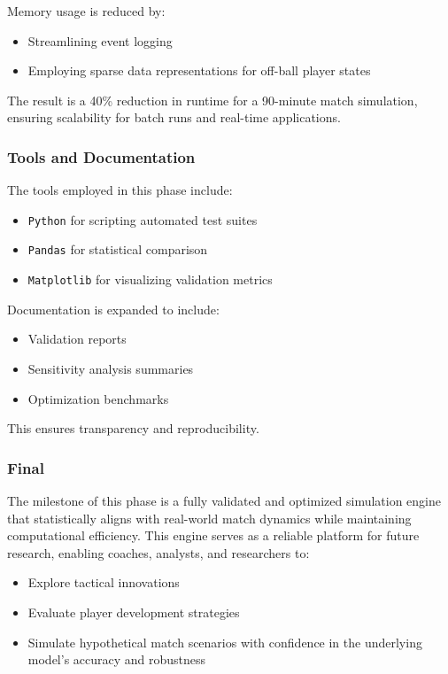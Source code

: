 \documentclass[12pt]{article}
\begin{document}
Memory usage is reduced by:
\begin{itemize}
    \item Streamlining event logging
    \item Employing sparse data representations for off-ball player states
\end{itemize}

The result is a 40\% reduction in runtime for a 90-minute match simulation, ensuring scalability for batch runs and real-time applications.

\subsubsection{Tools and Documentation}
The tools employed in this phase include:
\begin{itemize}
    \item \texttt{Python} for scripting automated test suites
    \item \texttt{Pandas} for statistical comparison
    \item \texttt{Matplotlib} for visualizing validation metrics
\end{itemize}

Documentation is expanded to include:
\begin{itemize}
    \item Validation reports
    \item Sensitivity analysis summaries
    \item Optimization benchmarks
\end{itemize}

This ensures transparency and reproducibility.

\subsubsection{Final}
The milestone of this phase is a fully validated and optimized simulation engine that statistically aligns with real-world match dynamics while maintaining computational efficiency. This engine serves as a reliable platform for future research, enabling coaches, analysts, and researchers to:
\begin{itemize}
    \item Explore tactical innovations
    \item Evaluate player development strategies
    \item Simulate hypothetical match scenarios with confidence in the underlying model's accuracy and robustness
\end{itemize}
\end{document}
